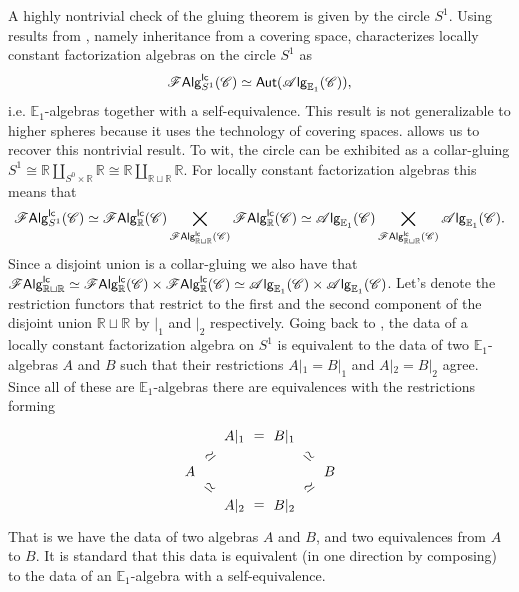 \documentclass[../text]{subfiles}
\begin{document}
\begin{example}\label{ex:reproduce_lcfas_on_S1}
    A highly nontrivial check of the gluing theorem is given by the circle $S^1$. Using results from \cite[prop.4.0.1]{cg2016}, namely inheritance from a covering space, \cite[sec.5.5]{ginot2015} characterizes locally constant factorization algebras on the circle $S^1$ as
    \begin{equation}
        \mathscr{F} \mathsf{Alg}^{\mathsf{lc}}_{S^1} (\mathscr{C}) \simeq \mathsf{Aut} (\mathscr{A} \mathsf{lg}_{\mathbb{E}_1} (\mathscr{C})),
    \end{equation}
    i.e. $\mathbb{E}_1$-algebras together with a self-equivalence. This result is not generalizable to higher spheres because it uses the technology of covering spaces.  allows us to recover this nontrivial result. To wit, the circle can be exhibited as a collar-gluing $S^1 \cong \mathbb{R} \coprod_{S^0 \times \mathbb{R}} \mathbb{R} \cong \mathbb{R} \coprod_{\mathbb{R} \sqcup \mathbb{R}} \mathbb{R}$. For locally constant factorization algebras this means that
    \begin{equation}\label{eq:lcfas_on_S1_gluing}
        \mathscr{F} \mathsf{Alg}^{\mathsf{lc}}_{S^1} (\mathscr{C}) \simeq \mathscr{F} \mathsf{Alg}^{\mathsf{lc}}_{\mathbb{R}} (\mathscr{C}) \bigtimes_{\mathscr{F} \mathsf{Alg}^{\mathsf{lc}}_{\mathbb{R} \sqcup \mathbb{R}} (\mathscr{C})} \mathscr{F} \mathsf{Alg}^{\mathsf{lc}}_{\mathbb{R}} (\mathscr{C}) \simeq \mathscr{A} \mathsf{lg}_{\mathbb{E}_1} (\mathscr{C}) \bigtimes_{\mathscr{F} \mathsf{Alg}^{\mathsf{lc}}_{\mathbb{R} \sqcup \mathbb{R}} (\mathscr{C})} \mathscr{A} \mathsf{lg}_{\mathbb{E}_1} (\mathscr{C}).
    \end{equation}
    Since a disjoint union is a collar-gluing we also have that $\mathscr{F} \mathsf{Alg}^{\mathsf{lc}}_{\mathbb{R} \sqcup \mathbb{R}} \simeq \mathscr{F} \mathsf{Alg}^{\mathsf{lc}}_{\mathbb{R}} (\mathscr{C}) \times \mathscr{F} \mathsf{Alg}^{\mathsf{lc}}_{\mathbb{R}} (\mathscr{C}) \simeq \mathscr{A} \mathsf{lg}_{\mathbb{E}_1} (\mathscr{C}) \times \mathscr{A} \mathsf{lg}_{\mathbb{E}_1} (\mathscr{C})$. Let's denote the restriction functors that restrict to the first and the second component of the disjoint union $\mathbb{R} \sqcup \mathbb{R}$ by $|_1$ and $|_2$ respectively. Going back to , the data of a locally constant factorization algebra on $S^1$ is equivalent to the data of two $\mathbb{E}_1$-algebras $A$ and $B$ such that their restrictions $A|_1 = B|_1$ and $A|_2 = B|_2$ agree. Since all of these are $\mathbb{E}_1$-algebras there are equivalences with the restrictions forming
    \begin{equation}
        \begin{tikzcd}[row sep = small, column sep= small]
            & A|_1 \arrow[r, phantom, "=", description] & B|_1 & \\
            A \arrow[rd, phantom, "\simeq", sloped, description] \arrow[ru, phantom, "\simeq", sloped, description] & & & B \arrow[lu, phantom, "\simeq", sloped, description] \arrow[ld,  phantom, "\simeq", sloped, description] \\
            & A|_2 \arrow[r, phantom, "=", description] & B|_2 &                        
        \end{tikzcd}
    \end{equation}
    That is we have the data of two algebras $A$ and $B$, and two equivalences from $A$ to $B$. It is standard that this data is equivalent (in one direction by composing) to the data of an $\mathbb{E}_1$-algebra with a self-equivalence.
\end{example}
\end{document}
